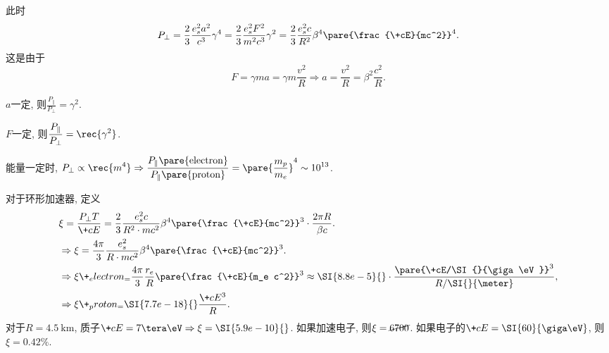 \documentclass[hidelinks]{ctexart}
\begin{document}
此时
\[ P_\perp = \frac{2}{3}\frac{e_s^2 a^2}{c^3}\gamma^4 = \frac{2}{3}\frac{e_s^2 F^2}{m^2 c^3}\gamma^2 = \frac{2}{3}\frac{e_s^2 c}{R^2}\beta^4\pare{\frac{\+cE}{mc^2}}^4. \]
这是由于
\[ F = \gamma ma = \gamma m \frac{v^2}{R} \Rightarrow a = \frac{v^2}{R} = \beta^2 \frac{c^2}{R}. \]
\begin{cenum}
    \item $a$一定, 则$\displaystyle \frac{P_\parallel}{P_\perp} = \gamma^2$.
    \item $F$一定, 则$\displaystyle \frac{P_\parallel}{P_\perp} = \rec{\gamma^2}$.
    \item 能量一定时, $\displaystyle P_\perp \propto \rec{m^4} \Rightarrow \frac{P_\parallel\pare{\mathrm{electron}}}{P_\parallel\pare{\mathrm{proton}}} = \pare{\frac{m_p}{m_e}}^4 \sim 10^{13}$.
    \item 对于环形加速器, 定义
    \begin{align*}
        & \xi = \frac{P_\perp T}{\+cE} = \frac{2}{3}\frac{e_s^2 c}{R^2 \cdot mc^2} \beta^4 \pare{\frac{\+cE}{mc^2}}^3 \cdot \frac{2\pi R}{\beta c}. \\
        & \Rightarrow \xi = \frac{4\pi}{3}\frac{e_s^2}{R\cdot mc^2}\beta^4\pare{\frac{\+cE}{mc^2}}^3. \\
        & \Rightarrow \xi\+_electron_ = \frac{4\pi}{3}\frac{r_e}{R}\pare{\frac{\+cE}{m_e c^2}}^3 \approx \SI{8.8e-5}{}\cdot \frac{\pare{\+cE/\SI{}{\giga\eV}}^3}{R/\SI{}{\meter}}, \\
        & \Rightarrow \xi\+_proton_ = \SI{7.7e-18}{}\frac{\+cE^3}{R}.
    \end{align*}
    对于$R = \SI{4.5}{\kilo\meter}$, 质子$\+cE=7{\tera\eV} \Rightarrow \xi = \SI{5.9e-10}{}$. 如果加速电子, 则$\xi = \cancel{\SI{6700}{}}$. 如果电子的$\+cE=\SI{60}{\giga\eV}$, 则$\xi = 0.42\%$.
\end{cenum}



\end{document}
